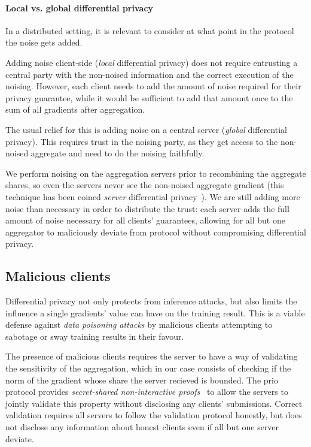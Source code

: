 \documentclass{article}
\begin{document}
\paragraph{Local vs. global differential privacy} In a distributed setting, it is relevant to consider at what point in the protocol the noise gets added.

Adding noise client-side (\textit{local} differential privacy) does not require entrusting a central party with the non-noised information and the correct execution of the noising. However, each client needs to add the amount of noise required for their privacy guarantee, while it would be sufficient to add that amount once to the sum of all gradients after aggregation.

The usual relief for this is adding noise on a central server (\textit{global} differential privacy). This requires trust in the noising party, as they get access to the non-noised aggregate and need to do the noising faithfully.

We perform noising on the aggregation servers prior to recombining the aggregate shares, so even the servers never see the non-noised aggregate gradient (this technique has been coined \emph{server} differential privacy~\cite{dprio}). We are still adding more noise than necessary in order to distribute the trust: each server adds the full amount of noise necessary for all clients' guarantees, allowing for all but one aggregator to maliciously deviate from protocol without compromising differential privacy.

\subsection{Malicious clients}
Differential privacy not only protects from inference attacks, but also limits the influence a single gradients' value can have on the training result. This is a viable defense against \textit{data poisoning attacks} by malicious clients attempting to sabotage or sway training results in their favour.

The presence of malicious clients requires the server to have a way of validating the sensitivity of the aggregation, which in our case consists of checking if the norm of the gradient whose share the server recieved is bounded. The prio protocol provides \textit{secret-shared non-interactive proofs}~\cite[Section 4]{prio} to allow the servers to jointly validate this property without disclosing any clients' submissions. Correct validation requires all servers to follow the validation protocol honestly, but does not disclose any information about honest clients even if all but one server deviate.
\end{document}
